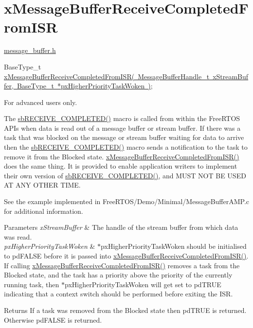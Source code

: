 \hypertarget{group__x_message_buffer_receive_completed_from_i_s_r}{}\section{x\+Message\+Buffer\+Receive\+Completed\+From\+I\+SR}
\label{group__x_message_buffer_receive_completed_from_i_s_r}
\mbox{\hyperlink{message__buffer_8h}{message\+\_\+buffer.\+h}}


\begin{DoxyPre}
BaseType\_t \mbox{\hyperlink{message__buffer_8h_a22b1a37d0d4f39acd87250f73d9aab0c}{xMessageBufferReceiveCompletedFromISR( MessageBufferHandle\_t xStreamBuffer, BaseType\_t *pxHigherPriorityTaskWoken )}};
\end{DoxyPre}


For advanced users only.

The \mbox{\hyperlink{stream__buffer_8c_a4d6a29d283acfa2d4ef576476eedc789}{sb\+R\+E\+C\+E\+I\+V\+E\+\_\+\+C\+O\+M\+P\+L\+E\+T\+E\+D()}} macro is called from within the Free\+R\+T\+OS A\+P\+Is when data is read out of a message buffer or stream buffer. If there was a task that was blocked on the message or stream buffer waiting for data to arrive then the \mbox{\hyperlink{stream__buffer_8c_a4d6a29d283acfa2d4ef576476eedc789}{sb\+R\+E\+C\+E\+I\+V\+E\+\_\+\+C\+O\+M\+P\+L\+E\+T\+E\+D()}} macro sends a notification to the task to remove it from the Blocked state. \mbox{\hyperlink{message__buffer_8h_a22b1a37d0d4f39acd87250f73d9aab0c}{x\+Message\+Buffer\+Receive\+Completed\+From\+I\+S\+R()}} does the same thing. It is provided to enable application writers to implement their own version of \mbox{\hyperlink{stream__buffer_8c_a4d6a29d283acfa2d4ef576476eedc789}{sb\+R\+E\+C\+E\+I\+V\+E\+\_\+\+C\+O\+M\+P\+L\+E\+T\+E\+D()}}, and M\+U\+ST N\+OT BE U\+S\+ED AT A\+NY O\+T\+H\+ER T\+I\+ME.

See the example implemented in Free\+R\+T\+O\+S/\+Demo/\+Minimal/\+Message\+Buffer\+A\+M\+P.\+c for additional information.


\begin{DoxyParams}{Parameters}
{\em x\+Stream\+Buffer} & The handle of the stream buffer from which data was read.\\
\hline
{\em px\+Higher\+Priority\+Task\+Woken} & $\ast$px\+Higher\+Priority\+Task\+Woken should be initialised to pd\+F\+A\+L\+SE before it is passed into \mbox{\hyperlink{message__buffer_8h_a22b1a37d0d4f39acd87250f73d9aab0c}{x\+Message\+Buffer\+Receive\+Completed\+From\+I\+S\+R()}}. If calling \mbox{\hyperlink{message__buffer_8h_a22b1a37d0d4f39acd87250f73d9aab0c}{x\+Message\+Buffer\+Receive\+Completed\+From\+I\+S\+R()}} removes a task from the Blocked state, and the task has a priority above the priority of the currently running task, then $\ast$px\+Higher\+Priority\+Task\+Woken will get set to pd\+T\+R\+UE indicating that a context switch should be performed before exiting the I\+SR.\\
\hline
\end{DoxyParams}
\begin{DoxyReturn}{Returns}
If a task was removed from the Blocked state then pd\+T\+R\+UE is returned. Otherwise pd\+F\+A\+L\+SE is returned. 
\end{DoxyReturn}
